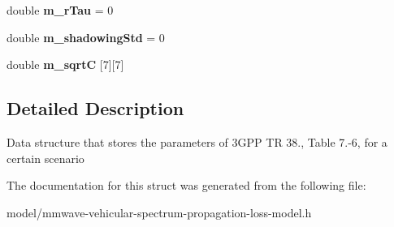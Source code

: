 \begin{DoxyCompactItemize}
\mbox{\label{structns3_1_1millicar_1_1ParamsTable_a69070ca57b3c78c2dd94712c3f6b32af}} 
double {\bfseries m\+\_\+r\+Tau} = 0
\item 
\mbox{\label{structns3_1_1millicar_1_1ParamsTable_afefbe1da3cc2cad794d5812ba6023261}} 
double {\bfseries m\+\_\+shadowing\+Std} = 0
\item 
\mbox{\label{structns3_1_1millicar_1_1ParamsTable_a49c997b83dfc2bedeea7a9971bc50f41}} 
double {\bfseries m\+\_\+sqrtC} \mbox{[}7\mbox{]}\mbox{[}7\mbox{]}
\end{DoxyCompactItemize}


\subsection{Detailed Description}
Data structure that stores the parameters of 3\+G\+PP TR 38., Table 7.-\/6, for a certain scenario 

The documentation for this struct was generated from the following file\+:\begin{DoxyCompactItemize}
\item 
model/mmwave-\/vehicular-\/spectrum-\/propagation-\/loss-\/model.\+h\end{DoxyCompactItemize}

